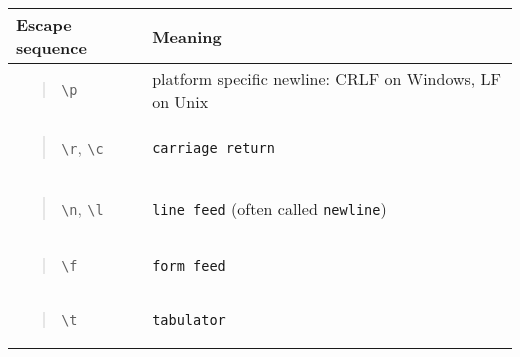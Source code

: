 \begin{longtable}[]{@{}ll@{}}
\toprule
Escape sequence & Meaning\tabularnewline
\midrule
\endhead
\begin{minipage}[t]{0.47\columnwidth}\raggedright
\begin{quote}
\texttt{\textbackslash{}p}
\end{quote}\strut
\end{minipage} & \begin{minipage}[t]{0.47\columnwidth}\raggedright
platform specific newline: CRLF on Windows, LF on Unix\strut
\end{minipage}\tabularnewline
\begin{minipage}[t]{0.47\columnwidth}\raggedright
\begin{quote}
\texttt{\textbackslash{}r}, \texttt{\textbackslash{}c}
\end{quote}\strut
\end{minipage} & \begin{minipage}[t]{0.47\columnwidth}\raggedright
\texttt{carriage\ return}\strut
\end{minipage}\tabularnewline
\begin{minipage}[t]{0.47\columnwidth}\raggedright
\begin{quote}
\texttt{\textbackslash{}n}, \texttt{\textbackslash{}l}
\end{quote}\strut
\end{minipage} & \begin{minipage}[t]{0.47\columnwidth}\raggedright
\texttt{line\ feed} (often called \texttt{newline})\strut
\end{minipage}\tabularnewline
\begin{minipage}[t]{0.47\columnwidth}\raggedright
\begin{quote}
\texttt{\textbackslash{}f}
\end{quote}\strut
\end{minipage} & \begin{minipage}[t]{0.47\columnwidth}\raggedright
\texttt{form\ feed}\strut
\end{minipage}\tabularnewline
\begin{minipage}[t]{0.47\columnwidth}\raggedright
\begin{quote}
\texttt{\textbackslash{}t}
\end{quote}\strut
\end{minipage} & \begin{minipage}[t]{0.47\columnwidth}\raggedright
\texttt{tabulator}\strut
\end{minipage}\tabularnewline

\end{longtable}
